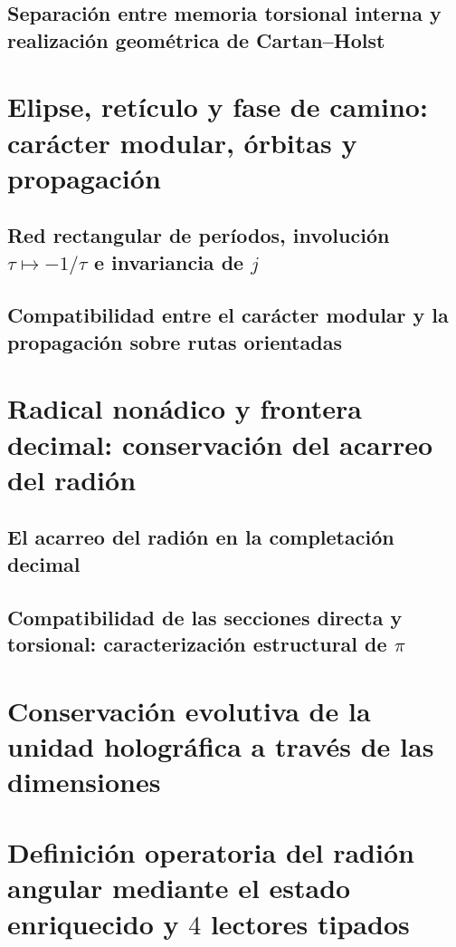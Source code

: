 \subsection{Separación entre memoria torsional interna y realización geométrica de Cartan--Holst}


\section{Elipse, retículo y fase de camino: carácter modular, órbitas y propagación}
\subsection{Red rectangular de períodos, involución \(\tau\mapsto-1/\tau\) e invariancia de \(j\)}

\subsection{Compatibilidad entre el carácter modular y la propagación sobre rutas orientadas}


\section{Radical nonádico y frontera decimal: conservación del acarreo del radión}
\subsection{El acarreo del radión en la completación decimal}

\subsection{Compatibilidad de las secciones directa y torsional: caracterización estructural de \(\pi\)}


\section{Conservación evolutiva de la unidad holográfica a través de las dimensiones}


\section{Definición operatoria del radión angular mediante el estado enriquecido y \(4\) lectores tipados}

